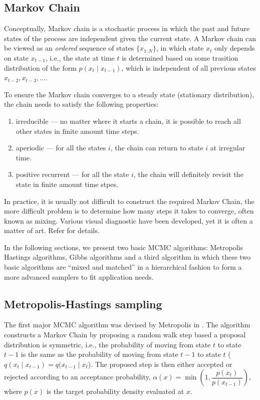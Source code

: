 \subsection{Markov Chain}
Conceptually, Markov chain is a stochastic process in which the past and future states of the process are independent given the current state. A Markov chain can be viewed as an \emph{ordered} sequence of states $\{x_{1:N}\}$, in which state $x_t$ only depends on state $x_{t-1}$, i.e., the state at time $t$ is determined based on some trasition distribution of the form $p(x_t \mid x_{t-1})$, which is independent of all previous states $x_{t-2}, x_{t-3}, \ldots$. 

To ensure the Markov chain converges to a steady state (stationary distribution), the chain needs to satisfy the following properties:
\begin{enumerate}
\item irreducible --- no matter where it starts a chain, it is possible to reach all other states in finite amount time steps.
\item aperiodic --- 	for all the states $i$, the chain can  return to state $i$ at irregular time.
\item positive recurrent --- for all the state $i$, the chain will definitely revisit the state in finite amount time stpes.
\end{enumerate}

In practice, it is usually not difficult to construct the required Markov Chain, the more difficult problem is to determine how many steps it takes to converge, often known as mixing. Various visual diagnostic have been developed, yet it is often a matter of art. Refer \cite{RCP05} for details.

In the following sections, we present two basic MCMC algorithms: Metropolis Hastings algorithms, Gibbs algorithms and a third algorithm in which these two basic algorithms are ``mixed and matched'' in a hierarchical fashion to form a more advanced samplers to fit application needs.

\subsection{Metropolis-Hastings sampling}
The first major MCMC algorithm was devised by Metropolis in \cite{MN53}. The algorithm constructs a Markov Chain by proposing a random walk step based a proposal distribution is symmetric, i.e., the probability of moving from state $t$ to state $t-1$ is the same as the probability of moving from state $t-1$ to state $t$ ($q(x_{t} \mid x_{t-1}) = q(x_{t-1} \mid x_{t}$). The proposed step is then either accepted or rejected according to an acceptance probability, $\alpha(x)= \min\left(1, \dfrac{p(x_t)}{p(x_{t-1})}\right)$, where $p(x)$ is the target probability density evaluated at $x$.

